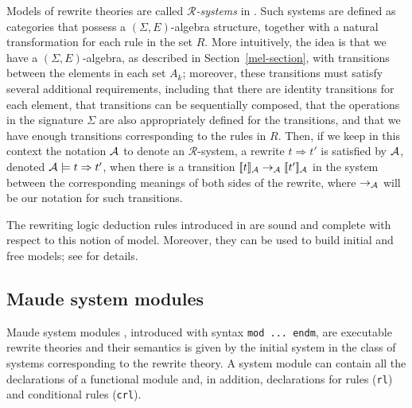 Models of rewrite theories are called \emph{$\mathcal{R}$-systems} in \cite{Meseguer92-tcs}.
Such systems are defined as categories that possess a $(\Sigma,E)$-algebra structure,
together with a natural transformation for each rule in the set $R$. More intuitively, the idea
is that we have a $(\Sigma,E)$-algebra, as described in Section~\ref{mel-section}, with
transitions between the elements in each set $A_k$; moreover, these transitions must 
satisfy several additional requirements, including that there are identity transitions for
each element, that transitions can be sequentially composed, that the operations in the
signature $\Sigma$ are also appropriately defined for the transitions, and that we have enough
transitions corresponding to the rules in $R$.   Then, if we keep in this context the notation 
$\mathcal{A}$ to denote an $\mathcal{R}$-system, a rewrite $t \Rightarrow t'$ is satisfied by $\mathcal{A}$, 
denoted $\mathcal{A} \models t \Rightarrow t'$, when there is a transition $[\![t]\!]_{\mathcal{A}} \rightarrow_{\mathcal{A}} [\![t']\!]_{\mathcal{A}}$
in the system between the corresponding meanings of both sides of the rewrite, where 
$\rightarrow_{\mathcal{A}}$ will be our notation for such transitions. 

The rewriting logic deduction rules introduced in \cite{Meseguer92-tcs} are sound and 
complete with respect to this notion of model. Moreover, they can be used to build
initial and free models; see \cite{Meseguer92-tcs} for details.

\subsection{Maude system modules}

Maude system modules \cite[Chapter 6]{maude-book}, introduced with syntax \texttt{mod ...\ endm}, 
are executable rewrite 
theories and their semantics is given by the initial system in the class of 
systems corresponding to the rewrite theory.  A system module can contain all the
declarations of a functional module and, in addition, declarations for rules (\texttt{rl})
and conditional rules (\texttt{crl}).

